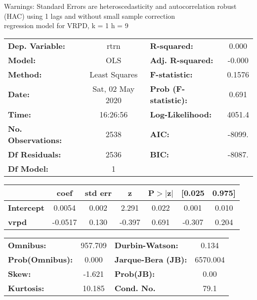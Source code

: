 Warnings: \newline
 [1] Standard Errors are heteroscedasticity and autocorrelation robust (HAC) using 1 lags and without small sample correction\\ 

regression model for VRPD, k = 1 h = 9\begin{center}
\begin{tabular}{lclc}
\toprule
\textbf{Dep. Variable:}    &       rtrn       & \textbf{  R-squared:         } &     0.000   \\
\textbf{Model:}            &       OLS        & \textbf{  Adj. R-squared:    } &    -0.000   \\
\textbf{Method:}           &  Least Squares   & \textbf{  F-statistic:       } &    0.1576   \\
\textbf{Date:}             & Sat, 02 May 2020 & \textbf{  Prob (F-statistic):} &    0.691    \\
\textbf{Time:}             &     16:26:56     & \textbf{  Log-Likelihood:    } &    4051.4   \\
\textbf{No. Observations:} &        2538      & \textbf{  AIC:               } &    -8099.   \\
\textbf{Df Residuals:}     &        2536      & \textbf{  BIC:               } &    -8087.   \\
\textbf{Df Model:}         &           1      & \textbf{                     } &             \\
\bottomrule
\end{tabular}
\begin{tabular}{lcccccc}
                   & \textbf{coef} & \textbf{std err} & \textbf{z} & \textbf{P$> |$z$|$} & \textbf{[0.025} & \textbf{0.975]}  \\
\midrule
\textbf{Intercept} &       0.0054  &        0.002     &     2.291  &         0.022        &        0.001    &        0.010     \\
\textbf{vrpd}      &      -0.0517  &        0.130     &    -0.397  &         0.691        &       -0.307    &        0.204     \\
\bottomrule
\end{tabular}
\begin{tabular}{lclc}
\textbf{Omnibus:}       & 957.709 & \textbf{  Durbin-Watson:     } &    0.134  \\
\textbf{Prob(Omnibus):} &   0.000 & \textbf{  Jarque-Bera (JB):  } & 6570.004  \\
\textbf{Skew:}          &  -1.621 & \textbf{  Prob(JB):          } &     0.00  \\
\textbf{Kurtosis:}      &  10.185 & \textbf{  Cond. No.          } &     79.1  \\
\bottomrule
\end{tabular}
\end{center}

